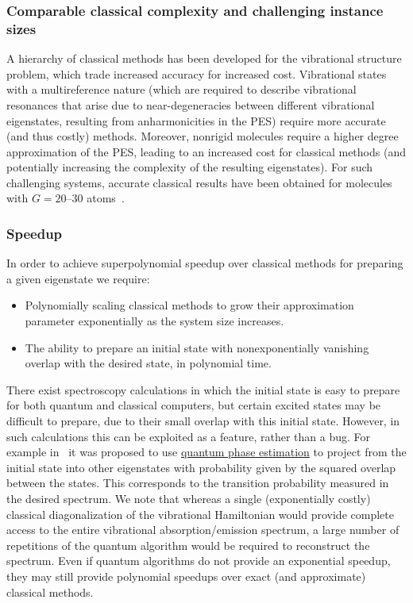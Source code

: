 \begin{refsection}
\subsubsection*{Comparable classical complexity and challenging instance sizes}
A hierarchy of classical methods has been developed for the vibrational structure problem, which trade increased accuracy for increased cost. Vibrational states with a multireference nature (which are required to describe vibrational resonances that arise due to near-degeneracies between different vibrational eigenstates, resulting from anharmonicities in the PES) require more accurate (and thus costly) methods. Moreover, nonrigid molecules require a higher degree approximation of the PES, leading to an increased cost for classical methods (and potentially increasing the complexity of the resulting eigenstates). For such challenging systems, accurate classical results have been obtained for molecules with $G=20$--$30$ atoms~\cite{carrington2017PerspectiveVibrationalSpectra,baiardi2017VibrationalDMRG,thomas2018UsingIterativeEigensolverVibrationalSpectra,Barone2021ComputationalMolecularSpectroscopy}.


\subsubsection*{Speedup}
In order to achieve superpolynomial speedup over classical methods for preparing a given eigenstate we require:
\begin{itemize}
    \item Polynomially scaling classical methods to grow their approximation parameter exponentially as the system size increases.
    \item The ability to prepare an initial state with nonexponentially vanishing overlap with the desired state, in polynomial time.
\end{itemize}
There exist spectroscopy calculations in which the initial state is easy to prepare for both quantum and classical computers, but certain excited states may be difficult to prepare, due to their small overlap with this initial state. However, in such calculations this can be exploited as a feature, rather than a bug. For example in~\cite{sawaya2019QuantumAlgorithmMolecularSpectra} it was proposed to use \hyperref[prim:QPE]{quantum phase estimation} to project from the initial state into other eigenstates with probability given by the squared overlap between the states. This corresponds to the transition probability measured in the desired spectrum. We note that whereas a single (exponentially costly) classical diagonalization of the vibrational Hamiltonian would provide complete access to the entire vibrational absorption/emission spectrum, a large number of repetitions of the quantum algorithm would be required to reconstruct the spectrum.
Even if quantum algorithms do not provide an exponential speedup, they may still provide polynomial speedups over exact (and approximate) classical methods.



\end{refsection}
